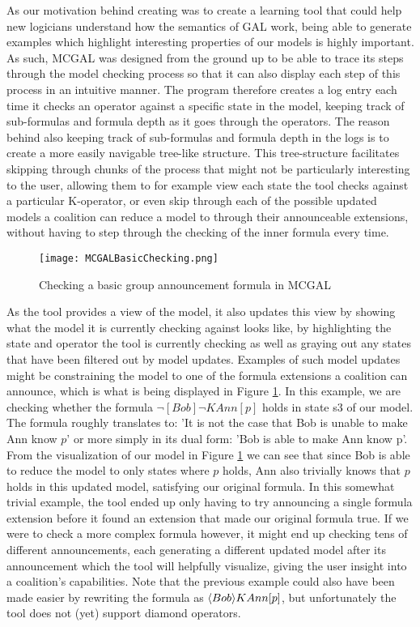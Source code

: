 As our motivation behind creating \cname was to create a learning tool that could help new logicians understand how the semantics of GAL work, being able to generate examples which highlight interesting properties of our models is highly important. As such, MCGAL was designed from the ground up to be able to trace its steps through the model checking process so that it can also display each step of this process in an intuitive manner. The program therefore creates a log entry each time it checks an operator against a specific state in the model, keeping track of sub-formulas and formula depth as it goes through the operators. The reason behind also keeping track of sub-formulas and formula depth in the logs is to create a more easily navigable tree-like structure. This tree-structure facilitates skipping through chunks of the process that might not be particularly interesting to the user, allowing them to for example view each state the tool checks against a particular K-operator, or even skip through each of the possible updated models a coalition can reduce a model to through their announceable extensions, without having to step through the checking of the inner formula every time.

\begin{figure}[H]
	\label{fig:basicGalChecking}
	\caption{Checking a basic group announcement formula in MCGAL}
	\texttt{[image: MCGALBasicChecking.png]}
\end{figure}

As the tool provides a view of the model, it also updates this view by showing what the model it is currently checking against looks like, by highlighting the state and operator the tool is currently checking as well as graying out any states that have been filtered out by model updates. Examples of such model updates might be constraining the model to one of the formula extensions a coalition can announce, which is what is being displayed in Figure \ref{fig:basicGalChecking}. In this example, we are checking whether the formula $\neg [Bob]\neg KAnn[p]$ holds in state s3 of our model. The formula roughly translates to: 'It is not the case that Bob is unable to make Ann know $p$' or more simply in its dual form: 'Bob is able to make Ann know p'. From the visualization of our model in Figure \ref{fig:basicGalChecking} we can see that since Bob is able to reduce the model to only states where $p$ holds, Ann also trivially knows that $p$ holds in this updated model, satisfying our original formula. In this somewhat trivial example, the tool ended up only having to try announcing a single formula extension before it found an extension that made our original formula true. If we were to check a more complex formula however, it might end up checking tens of different announcements, each generating a different updated model after its announcement which the tool will helpfully visualize, giving the user insight into a coalition's capabilities. Note that the previous example could also have been made easier by rewriting the formula as $\langle Bob\rangle KAnn[p]$, but unfortunately the tool does not (yet) support diamond operators. 


